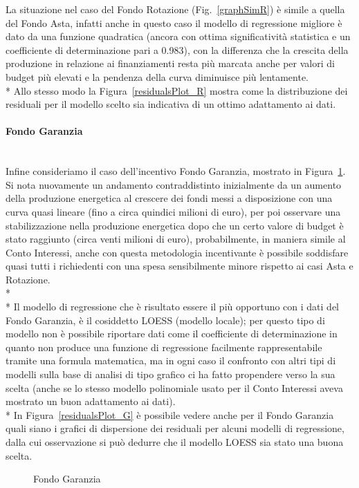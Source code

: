 \documentclass[12pt,a4paper,openright,twoside]{report}
\newcommand{\myparagraph}[1]{\paragraph{#1}\mbox{}\\}
\begin{document}
La situazione nel caso del Fondo Rotazione (Fig.~\ref{graphSimR}) è simile a quella del Fondo Asta, infatti anche in questo caso il modello di regressione migliore è dato da una funzione quadratica (ancora con ottima significatività statistica e un coefficiente di determinazione pari a 0.983), con la differenza che la crescita della produzione in relazione ai finanziamenti resta più marcata anche per valori di budget più elevati e la pendenza della curva diminuisce più lentamente.\\*
Allo stesso modo la Figura~\ref{residualsPlot_R} mostra come la distribuzione dei residuali per il modello scelto sia indicativa di un ottimo adattamento ai dati.

\myparagraph{Fondo Garanzia}

Infine consideriamo il caso dell'incentivo Fondo Garanzia, mostrato in Figura~\ref{graphSimG}. Si nota nuovamente un andamento contraddistinto inizialmente da un aumento della produzione energetica al crescere dei fondi messi a disposizione con una curva quasi lineare (fino a circa quindici milioni di euro), per poi osservare una stabilizzazione nella produzione energetica dopo che un certo valore di budget è stato raggiunto (circa venti milioni di euro), probabilmente, in maniera simile al Conto Interessi, anche con questa metodologia incentivante è possibile soddisfare quasi tutti i richiedenti con una spesa sensibilmente minore rispetto ai casi Asta e Rotazione.\\*\\*
Il modello di regressione che è risultato essere il più opportuno con i dati del Fondo Garanzia, è il cosiddetto LOESS (modello locale); per questo tipo di modello non è possibile riportare dati come il coefficiente di determinazione in quanto non produce una funzione di regressione facilmente rappresentabile tramite una formula matematica, ma in ogni caso il confronto con altri tipi di modelli sulla base di analisi di tipo grafico ci ha fatto propendere verso la sua scelta (anche se lo stesso modello polinomiale usato per il Conto Interessi aveva mostrato un buon adattamento ai dati).\\*
In Figura~\ref{residualsPlot_G} è possibile vedere anche per il Fondo Garanzia quali siano i grafici di dispersione dei residuali per alcuni modelli di regressione, dalla cui osservazione si può dedurre che il modello LOESS sia stato una buona scelta.

\begin{figure}[H]
	\centering
	\qquad
	\caption{Fondo Garanzia}
	\label{graphSimG}
\end{figure}
\end{document}
